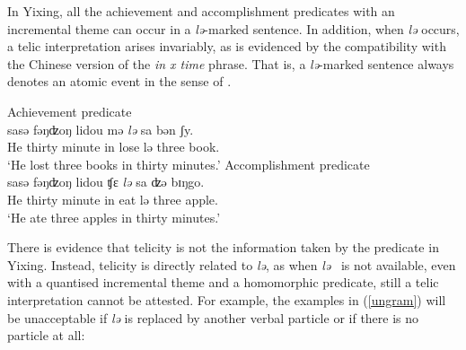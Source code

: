 \documentclass[output=paper]{langsci/langscibook}
\begin{document}
In Yixing, all the achievement and accomplishment predicates with an
incremental theme can occur in a \emph{lə}-marked sentence. In addition, when
\emph{lə} occurs, a telic interpretation arises invariably, as is evidenced by
the compatibility with the Chinese version of the \emph{in x time} phrase. That
is, a \emph{lə}-marked sentence always denotes an atomic event in the sense of
\textcite{Rothstein2004}.

\begin{exe}
\ex Achievement predicate\\
   \label{achievement predicate}  {sasə} {fəŋʣoŋ} lidou {mə} \emph{lə} sa bən ʃy. \\
    He thirty minute in lose {lə} three \Clf{} book. \\
    \glt \enquote*{He lost three books in thirty minutes.}
\ex Accomplishment predicate\\
   \label{accomplishment predicate}  {sasə} {fəŋʣoŋ} lidou {ʧε} \emph{lə} sa {ʣə} bɪŋgo. \\
    He thirty minute in eat {lə} three \Clf{} apple. \\
    \glt \enquote*{He ate three apples in thirty minutes.}
\end{exe}

There is evidence that telicity is not the information taken by the predicate
in Yixing. Instead, telicity is directly related to \emph{lə}, as when
\emph{lə} \ is not available, even with a quantised incremental theme and a
homomorphic predicate, still a telic interpretation cannot be attested. For
example, the examples in (\ref{ungram}) will be unacceptable if
\emph{lə} is replaced by another verbal particle or if there is no particle at
all:

\begin{exe}
    \ex\label{ungram} 
    \begin{xlist}
    \end{xlist}
\end{exe}
\end{document}
